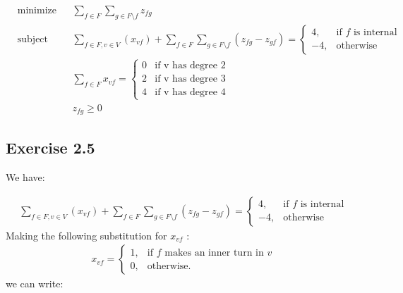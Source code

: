 \documentclass[12pt]{article}
\begin{document}
  \begin{equation*}
    \begin{aligned}
    & {\text{minimize}}
    & & \sum_{f \in F}\sum_{g \in F \setminus f} z_{fg} \\
    & \text{subject to}
    & & \sum_{f \in F, v \in V}(x_{vf}) + \sum_{f \in F}\sum_{g \in F \setminus f}(z_{fg} - z_{gf}) = \begin{cases}
                                                                                      4, & \text{if } f \text{ is internal}\\
                                                                                      -4, & \text{otherwise}
                                                                                     \end{cases} \\
    & & &  \sum_{f \in F}{x_{vf}} = \begin{cases}
                                        0 & \text{if v has degree 2}\\
                                        2 & \text{if v has degree 3}\\
                                        4 & \text{if v has degree 4}
                                    \end{cases}\\
    & & & z_{fg} \geq 0
    \end{aligned}
  \end{equation*}

\subsection*{Exercise 2.5}

We have:

\begin{align*}
      \sum_{f \in F, v \in V}(x_{vf}) + \sum_{f \in F}\sum_{g \in F \setminus f}(z_{fg} - z_{gf}) = \begin{cases}
                                                                                       4, & \text{if } f \text{ is internal}\\
                                                                                      -4, & \text{otherwise}
                                                                                   \end{cases}
\end{align*}
Making the following substitution for $x_{vf}$ :
\begin{align*}
  x_{vf} =  \begin{cases}
               1, & \text{if } f \text{ makes an inner turn in } v \\
               0, & \text{otherwise.}
            \end{cases}
\end{align*}
we can write:
\end{document}
